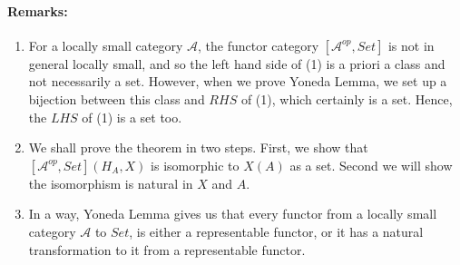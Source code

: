 \documentclass[a4paper]{article}
\theoremstyle{definition}
\begin{document}
		\paragraph{Remarks:} \begin{enumerate}
			\item For a locally small category $ \mathcal{A} $, the functor category
				$[ \mathcal{A} ^{op},Set ]$ is not in general locally small,
				and so the left hand side of (1) is a priori a class
				and not necessarily a set. However, when we prove Yoneda
				Lemma, we set up a bijection between this class and $RHS$
				of (1), which certainly is a set. Hence, the $LHS$ of (1)
				is a set too.
			\item We shall prove the theorem in two steps. First, we show that
				$[ \mathcal{A} ^{op}, Set](H_A,X)$ is isomorphic to $X(A)$
				as a set. Second we will show the isomorphism
				is natural in $X$ and $A$.
			\item In a way, Yoneda Lemma gives us that every functor from a locally
				small category $ \mathcal{A} $ to $Set$, is either a representable
				functor, or it has a natural transformation to it from a
				representable functor.
\end{enumerate}
\end{document}
